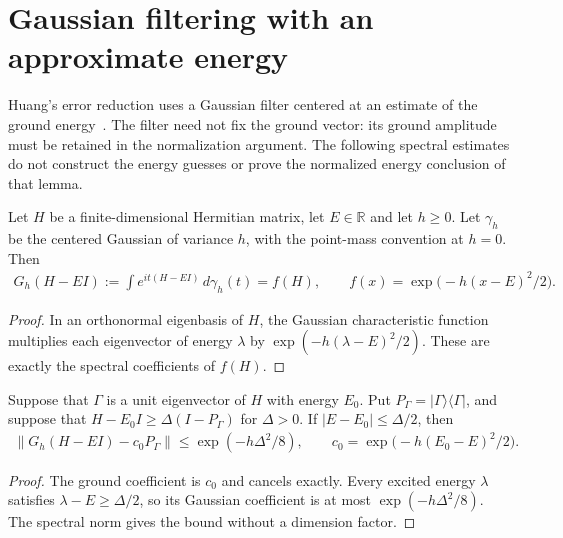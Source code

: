 \section{Gaussian filtering with an approximate energy}
\label{sec:huang_approximate_energy_filter}

Huang's error reduction uses a Gaussian filter centered at an estimate of
the ground energy~\cite[Section 5.4, equation (19) and Lemma 18]{Huang2015GroundState}.
The filter need not fix the ground vector: its ground amplitude must be
retained in the normalization argument. The following spectral estimates
do not construct the energy guesses or prove the normalized energy
conclusion of that lemma.

\begin{lemma}
    \label{thm:huang_gaussian_spectral_multiplier}
    \leanok
    Let $H$ be a finite-dimensional Hermitian matrix, let $E\in\mathbb R$
    and let $h\ge0$. Let $\gamma_h$ be the centered Gaussian of variance
    $h$, with the point-mass convention at $h=0$. Then
    \begin{align}
        G_h(H-EI)
        :=\int e^{it(H-EI)}\,d\gamma_h(t)
        =f(H),\qquad
        f(x)=\exp\bigl(-h(x-E)^2/2\bigr).
    \end{align}
\end{lemma}
\begin{proof}
    \leanok
    In an orthonormal eigenbasis of $H$, the Gaussian characteristic
    function multiplies each eigenvector of energy $\lambda$ by
    $\exp(-h(\lambda-E)^2/2)$. These are exactly the spectral
    coefficients of $f(H)$.
\end{proof}

\begin{lemma}
    \label{thm:huang_approximate_energy_suppression}
    \leanok
    Suppose that $\Gamma$ is a unit eigenvector of $H$ with energy
    $E_0$. Put $P_\Gamma=|\Gamma\rangle\langle\Gamma|$, and suppose
    that $H-E_0I\ge\Delta(I-P_\Gamma)$ for $\Delta>0$. If
    $|E-E_0|\le\Delta/2$, then
    \begin{align}
        \bigl\|G_h(H-EI)-c_0P_\Gamma\bigr\|
        \le\exp(-h\Delta^2/8),\qquad
        c_0=\exp\bigl(-h(E_0-E)^2/2\bigr).
    \end{align}
\end{lemma}
\begin{proof}
    \leanok
    The ground coefficient is $c_0$ and cancels exactly. Every excited
    energy $\lambda$ satisfies
    $\lambda-E\ge\Delta/2$, so its Gaussian coefficient is at most
    $\exp(-h\Delta^2/8)$. The spectral norm gives the bound without a
    dimension factor.
\end{proof}

